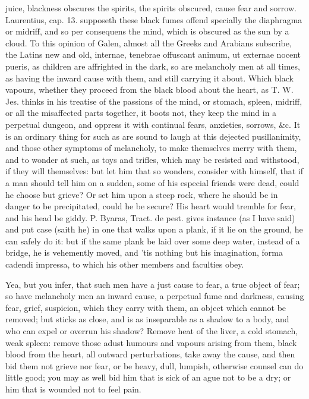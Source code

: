 {juice, blackness obscures the spirits, the spirits obscured, cause fear
and sorrow. Laurentius, cap. 13. supposeth these black fumes offend
specially the diaphragma or midriff, and so per consequens the mind,
which is obscured as the sun by a cloud. To this opinion of
Galen, almost all the Greeks and Arabians subscribe, the Latins new and
old, internae, tenebrae offuscant animum, ut externae nocent pueris, as
children are affrighted in the dark, so are melancholy men at all
times, as having the inward cause with them, and still carrying
it about. Which black vapours, whether they proceed from the black
blood about the heart, as T. W. Jes. thinks in his treatise of the
passions of the mind, or stomach, spleen, midriff, or all the
misaffected parts together, it boots not, they keep the mind in a
perpetual dungeon, and oppress it with continual fears, anxieties,
sorrows, \&c. It is an ordinary thing for such as are sound to laugh at
this dejected pusillanimity, and those other symptoms of melancholy, to
make themselves merry with them, and to wonder at such, as toys and
trifles, which may be resisted and withstood, if they will themselves:
but let him that so wonders, consider with himself, that if a man
should tell him on a sudden, some of his especial friends were dead,
could he choose but grieve? Or set him upon a steep rock, where he
should be in danger to be precipitated, could he be secure? His heart
would tremble for fear, and his head be giddy. P. Byaras, Tract. de
pest. gives instance (as I have said) and put case (saith he) in
one that walks upon a plank, if it lie on the ground, he can safely do
it: but if the same plank be laid over some deep water, instead of a
bridge, he is vehemently moved, and 'tis nothing but his imagination,
forma cadendi impressa, to which his other members and faculties obey.

Yea, but you infer, that such men have a just cause to fear, a true
object of fear; so have melancholy men an inward cause, a perpetual
fume and darkness, causing fear, grief, suspicion, which they carry
with them, an object which cannot be removed; but sticks as close, and
is as inseparable as a shadow to a body, and who can expel or overrun
his shadow? Remove heat of the liver, a cold stomach, weak spleen:
remove those adust humours and vapours arising from them, black blood
from the heart, all outward perturbations, take away the cause, and
then bid them not grieve nor fear, or be heavy, dull, lumpish,
otherwise counsel can do little good; you may as well bid him that is
sick of an ague not to be a dry; or him that is wounded not to feel
pain.

}
